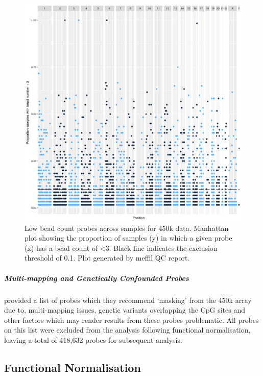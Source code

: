 \documentclass[
]{book}
\begin{document}
\begin{figure}

{\centering \includegraphics[width=0.8\linewidth]{figs/MAVIDOSqc450kbeadNumAcross} 

}

\caption{Low bead count probes across samples for 450k data. Manhattan plot showing the proportion of samples (y) in which a given probe (x) has a bead count of \textless3. Black line indicates the exclusion threshold of 0.1. Plot generated by meffil QC report.}\label{fig:MAVIDOSqc450kbeadNumAcross}
\end{figure}



\hypertarget{multi-mapping-and-genetically-confounded-probes-1}{%
\subparagraph{Multi-mapping and Genetically Confounded Probes}\label{multi-mapping-and-genetically-confounded-probes-1}}

\citet{Zhou2017} provided a list of probes which they recommend `masking' from the 450k array due to, multi-mapping issues, genetic variants overlapping the CpG sites and other factors which may render results from these probes problematic.
All probes on this list were excluded from the analysis following functional normalisation, leaving a total of 418,632 probes for subsequent analysis.

\hypertarget{functional-normalisation-1}{%
\subsection{Functional Normalisation}\label{functional-normalisation-1}}
\end{document}
